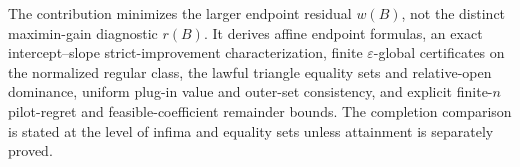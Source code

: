 The contribution minimizes the larger endpoint residual \(w(B)\), not the distinct maximin-gain diagnostic \(r(B)\).  It derives affine endpoint formulas, an exact intercept--slope strict-improvement characterization, finite \(\varepsilon\)-global certificates on the normalized regular class, the lawful triangle equality sets and relative-open dominance, uniform plug-in value and outer-set consistency, and explicit finite-\(n\) pilot-regret and feasible-coefficient remainder bounds.  The completion comparison is stated at the level of infima and equality sets unless attainment is separately proved.